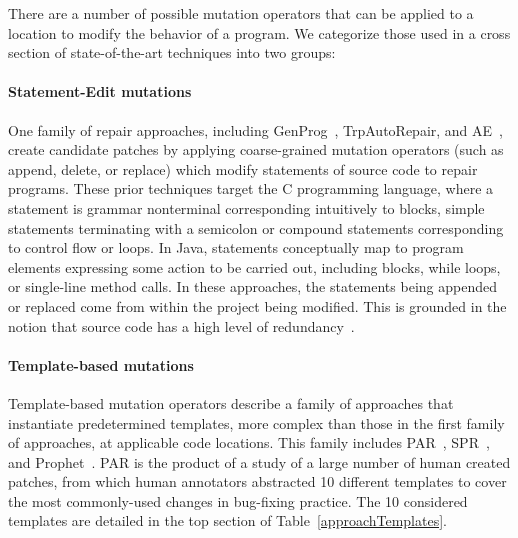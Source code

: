 \documentclass[conference]{IEEEtran}
\begin{document}
There are a number of possible mutation operators that can be applied to a location 
to modify the behavior of a program.  We categorize those used in a cross
section of state-of-the-art techniques into two groups: 

\paragraph{Statement-Edit mutations}
One family of repair approaches, including GenProg~\cite{legoues12}, 
TrpAutoRepair\cite{Qi13TrpAutoR}, and AE~\cite{Weimer13},
create candidate 
patches by applying coarse-grained mutation operators (such as append, delete, or 
replace) which modify statements of source code to 
repair programs. These prior techniques target the C programming language, where
a statement is grammar nonterminal corresponding intuitively to blocks,
simple statements terminating
with a semicolon or compound statements corresponding to control flow or
loops. In Java, statements conceptually map to program elements expressing
some action to be carried out, including blocks,  while loops, or single-line
method calls. In these approaches, the statements being appended or replaced come from within the project being modified. This is grounded in the notion that source code has a high level of redundancy~\cite{gabel10}.

\paragraph{Template-based mutations}
Template-based mutation operators describe a family of approaches that instantiate
predetermined templates, more complex than those in the first family of
approaches, at applicable code locations.  This family includes PAR~\cite{kim2013}, 
SPR~\cite{fan15SPR}, and 
Prophet~\cite{long16proph}.
%
PAR is the product of a study of a large number of 
human 
created patches, from which human annotators abstracted 10 different templates to cover
the most commonly-used changes in bug-fixing practice.
The 10 considered templates are detailed in the top section of Table~\ref{approachTemplates}.
\end{document}
